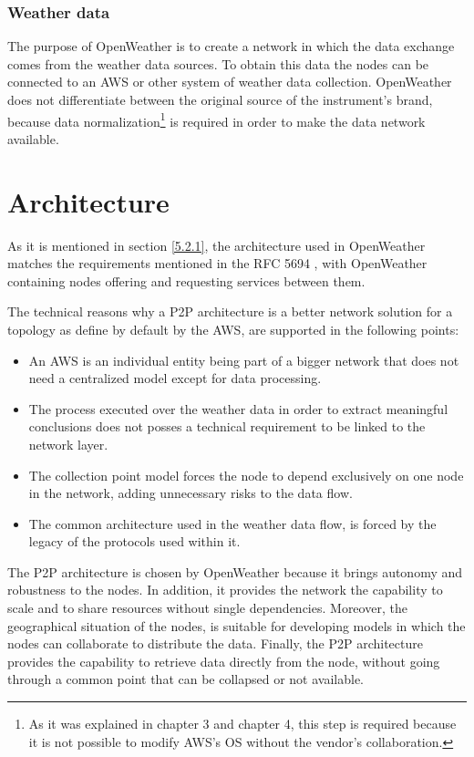 \subsubsection{Weather data}

The purpose of OpenWeather is to create a network in which the data exchange comes from the weather data sources. To obtain this data the nodes can be connected to an \gls{AWS} or other system of weather data collection. OpenWeather does not differentiate between the original source of the instrument's brand, because data normalization\footnote{As it was explained in chapter 3 and chapter 4, this step is required because it is not possible to modify \gls{AWS}'s \gls{OS} without the vendor's collaboration.} is required in order to make the data network available.

\section{Architecture}

As it is mentioned in section \ref{5.2.1}, the architecture used in OpenWeather matches the requirements mentioned in the \gls{RFC} 5694 \cite{rfc5694}, with OpenWeather containing nodes offering and requesting services between them.

The technical reasons why a \gls{P2P} architecture is a better network solution for a topology as define by default by the \gls{AWS}, are supported in the following points:

\begin{itemize}
\item	An \gls{AWS} is an individual entity being part of a bigger network that does not need a centralized model except for data processing.
\item	The process executed over the weather data in order to extract meaningful  conclusions does not posses a technical requirement to be linked to the network layer.
\item	The collection point model forces the node to depend exclusively on one node in the network, adding unnecessary risks to the data flow.
\item	The common architecture used in the weather data flow, is forced by the legacy of the protocols used within it.
\end{itemize}

The \gls{P2P} architecture  is chosen by OpenWeather because it brings autonomy and robustness to the nodes. In addition, it provides the network the capability to scale and to share resources without single dependencies. Moreover, the geographical situation of the nodes, is suitable for developing models in which the nodes can collaborate to distribute the data. Finally, the \gls{P2P} architecture provides the capability to retrieve data directly from the node, without going through a common point that can be collapsed or not available.

